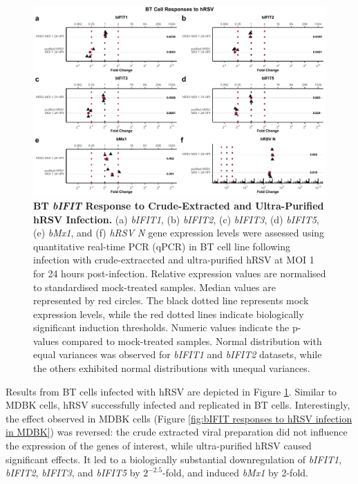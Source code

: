 \begin{figure}
    \centering
    \includegraphics[width=1\linewidth]{07. Chapter 2/Figs/02. Induction/10. bt_hrsv.pdf}
    \caption[BT \textit{bIFIT} Response to Crude-Extracted and Ultra-Purified hRSV Infection.]{\textbf{BT \textit{bIFIT} Response to Crude-Extracted and Ultra-Purified hRSV Infection.} (a) \textit{bIFIT1}, (b) \textit{bIFIT2}, (c) \textit{bIFIT3}, (d) \textit{bIFIT5}, (e) \textit{bMx1}, and (f) \textit{hRSV N} gene expression levels were assessed using quantitative real-time PCR (qPCR) in BT cell line following infection with crude-extraccted and ultra-purified hRSV at MOI 1 for 24 hours post-infection. Relative expression values are normalised to standardised mock-treated samples. Median values are represented by red circles. The black dotted line represents mock expression levels, while the red dotted lines indicate biologically significant induction thresholds. Numeric values indicate the p-values compared to mock-treated samples. Normal distribution with equal variances was observed for \textit{bIFIT1} and \textit{bIFIT2} datasets, while the others exhibited normal distributions with unequal variances.}
    \label{fig:Bt responses to hRSV}
\end{figure}

Results from BT cells infected with hRSV are depicted in Figure \ref{fig:Bt responses to hRSV}. Similar to MDBK cells, hRSV successfully infected and replicated in BT cells. Interestingly, the effect observed in MDBK cells (Figure \ref{fig:bIFIT responses to hRSV infection in MDBK}) was reversed: the crude extracted viral preparation did not influence the expression of the genes of interest, while ultra-purified hRSV caused significant effects. It led to a biologically substantial downregulation of \textit{bIFIT1}, \textit{bIFIT2}, \textit{bIFIT3}, and \textit{bIFIT5} by \(2^{-2.5}\)-fold, and induced \textit{bMx1} by 2-fold.